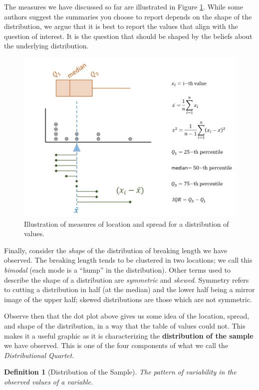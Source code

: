\documentclass[
]{book}
\theoremstyle{plain}
\theoremstyle{mydefn}
\newtheorem{definition}{Definition}[chapter]
\theoremstyle{myexmpl}
\theoremstyle{remark}
\begin{document}
The measures we have discussed so far are illustrated in Figure \ref{fig:summaries-summaries}. While some authors suggest the summaries you choose to report depends on the shape of the distribution, we argue that it is best to report the values that align with the question of interest. It is the question that should be shaped by the beliefs about the underlying distribution.

\begin{figure}

{\centering \includegraphics[width=0.8\linewidth]{./images/Summaries-Summaries} 

}

\caption{Illustration of measures of location and spread for a distribution of values.}\label{fig:summaries-summaries}
\end{figure}

Finally, consider the \emph{shape} of the distribution of breaking length we have observed. The breaking length tends to be clustered in two locations; we call this \emph{bimodal} (each mode is a ``hump'' in the distribution). Other terms used to describe the shape of a distribution are \emph{symmetric} and \emph{skewed}. Symmetry refers to cutting a distribution in half (at the median) and the lower half being a mirror image of the upper half; skewed distributions are those which are not symmetric.

Observe then that the dot plot above gives us some idea of the location, spread, and shape of the distribution, in a way that the table of values could not. This makes it a useful graphic as it is characterizing the \textbf{distribution of the sample} we have observed. This is one of the four components of what we call the \emph{Distributional Quartet}.

\begin{definition}[Distribution of the Sample]
\protect\hypertarget{def:defn-distribution-sample}{}{\label{def:defn-distribution-sample} {} }The pattern of variability in the observed values of a variable.
\end{definition}
\end{document}
